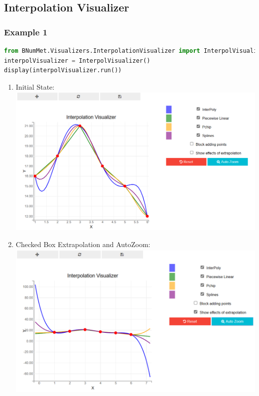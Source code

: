 \subsection{Interpolation Visualizer}
\subsubsection{Example 1}
\begin{lstlisting}[language=Python]
from BNumMet.Visualizers.InterpolationVisualizer import InterpolVisualizer
interpolVisualizer = InterpolVisualizer()
display(interpolVisualizer.run())
\end{lstlisting}
\begin{enumerate}
\item Initial State: \\
\includegraphics[scale=0.5]{Include/Images/Thesis/Documentation/Visualizers/Interpolation/Example 1/Example 1 - 00 - Initial State.png}

\item Checked Box Extrapolation and AutoZoom: \\
\includegraphics[scale=0.5]{Include/Images/Thesis/Documentation/Visualizers/Interpolation/Example 1/Example 1 - 01 - Checked Box Extrapolation and AutoZoom.png}


\end{enumerate}
